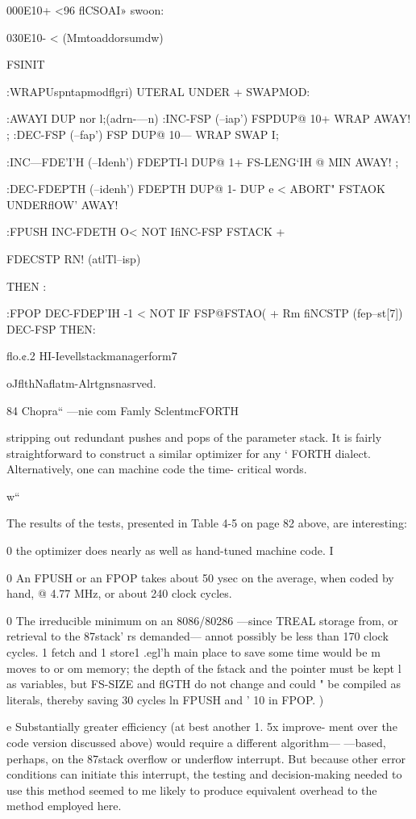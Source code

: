 {{{{{000E10+ <96 flCSOAI» swoon:

030E10- <%
(Mmtoaddorsumdw)

FSINIT

:WRAPUspntapmodflgri) \rmkeiatnckdrcuar
[flGTH@] UTERAL UNDER + SWAPMOD:

:AWAYI DUP nor l;(adrn-—n) \ueeiuieetoredwoie
:INC-FSP (--iap') FSPDUP@ 10+ WRAP AWAY! ;
:DEC-FSP (--fap') FSP DUP@ 10— WRAP SWAP I;

:INC—FDE’I'H (--Idenh')
FDEPTI-l DUP@ 1+ FS-LENG‘IH @ MIN
AWAY! ;

:DEC-FDEPTH (--idenh')
FDEPTH DUP@ 1- DUP e <
ABORT" FSTAOK UNDERflOW' AWAY!

:FPUSH INC-FDETH O< NOT
IfiNC-FSP FSTACK +

FDECSTP RN! (atlTl--isp)

THEN :

:FPOP DEC-FDEP'IH -1 < NOT
IF FSP@FSTAO( +
Rm fiNCSTP (fep--st[7])
DEC-FSP THEN:

 

 

 

flo.¢.2 HI-Ievellstackmanagerform7

oJflthNaflatm-Alrtgnsnasrved.

84 Chopra“ —nie com Famly SclentmcFORTH

stripping out redundant pushes and pops of the parameter stack.
It is fairly straightforward to construct a similar optimizer for any ‘
FORTH dialect. Alternatively, one can machine code the time-
critical words.

w“

The results of the tests, presented in Table 4-5 on page 82 above,
are interesting:

0 the optimizer does nearly as well as hand-tuned machine code. I

0 An FPUSH or an FPOP takes about 50 ysec on the average,
when coded by hand, @ 4.77 MHz, or about 240 clock cycles.

0 The irreducible minimum on an 8086/80286 —since TREAL
storage from, or retrieval to the 87stack' rs demanded— annot
possibly be less than 170 clock cycles. 1 fetch and 1 store1 .egl'h
main place to save some time would be m moves to or om
memory; the depth of the fstack and the pointer must be kept l
as variables, but FS-SIZE and flGTH do not change and could "
be compiled as literals, thereby saving 30 cycles ln FPUSH and '
10 in FPOP. )

e Substantially greater efficiency (at best another 1. 5x improve-
ment over the code version discussed above) would require a
different algorithm— —based, perhaps, on the 87stack overflow
or underflow interrupt. But because other error conditions can
initiate this interrupt, the testing and decision-making needed
to use this method seemed to me likely to produce equivalent
overhead to the method employed here.

}}}}}
